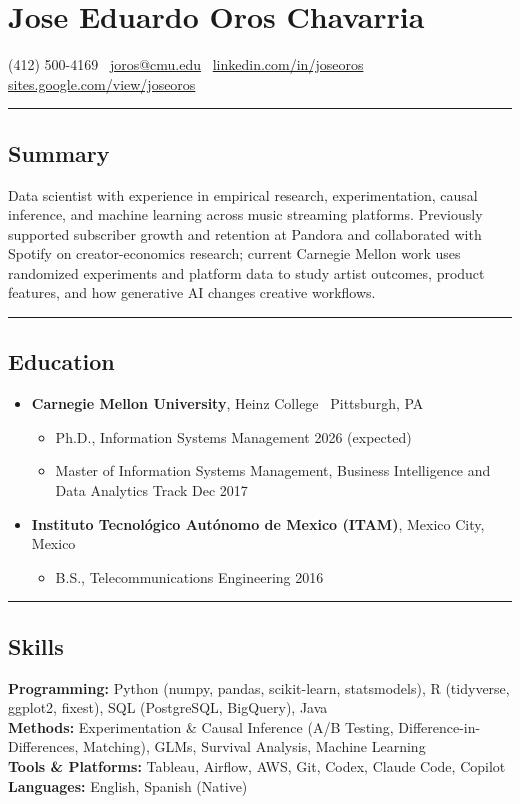 \documentclass[10pt,letterpaper]{article}
\newcommand{\name}[1]{\section*{#1}}
\newcommand{\sep}{{\color{gray}\,\textbullet\,\,}}
\newcommand{\hsep}{\noindent\textcolor{gray}{\rule{\textwidth}{0.5pt}}}
\newcommand{\block}[1]{\begin{samepage}\hsep\subsection*{#1}\end{samepage}}
\begin{document}
\name{Jose Eduardo Oros Chavarria}

\begin{center}
(412) 500-4169 \sep \href{mailto:joros@cmu.edu}{joros@cmu.edu} \sep \href{https://www.linkedin.com/in/joseoros}{linkedin.com/in/joseoros} \sep \href{https://sites.google.com/view/joseoros}{sites.google.com/view/joseoros}
\end{center}

\block{Summary}

\noindent Data scientist with experience in empirical research, experimentation, causal inference, and machine learning across music streaming platforms. Previously supported subscriber growth and retention at Pandora and collaborated with Spotify on creator-economics research; current Carnegie Mellon work uses randomized experiments and platform data to study artist outcomes, product features, and how generative AI changes creative workflows.

\block{Education}

\begin{itemize}[leftmargin=0pt, label={}, itemsep=4pt]
\item \textbf{Carnegie Mellon University}, Heinz College \sep Pittsburgh, PA
  \begin{itemize}[label={}]
  \item Ph.D., Information Systems Management \hfill 2026 (expected)
  \item Master of Information Systems Management, Business Intelligence and Data Analytics Track \hfill Dec 2017
  \end{itemize}
\item \textbf{Instituto Tecnol\'ogico Aut\'onomo de Mexico (ITAM)}, Mexico City, Mexico
  \begin{itemize}[label={}]
  \item B.S., Telecommunications Engineering \hfill 2016
  \end{itemize}
\end{itemize}

\block{Skills}

\noindent\textbf{Programming:} Python (numpy, pandas, scikit-learn, statsmodels), R (tidyverse, ggplot2, fixest), SQL (PostgreSQL, BigQuery), Java \\
\textbf{Methods:} Experimentation \& Causal Inference (A/B Testing, Difference-in-Differences, Matching), GLMs, Survival Analysis, Machine Learning \\
\textbf{Tools \& Platforms:} Tableau, Airflow, AWS, Git, Codex, Claude Code, Copilot \\
\textbf{Languages:} English, Spanish (Native)
\end{document}
